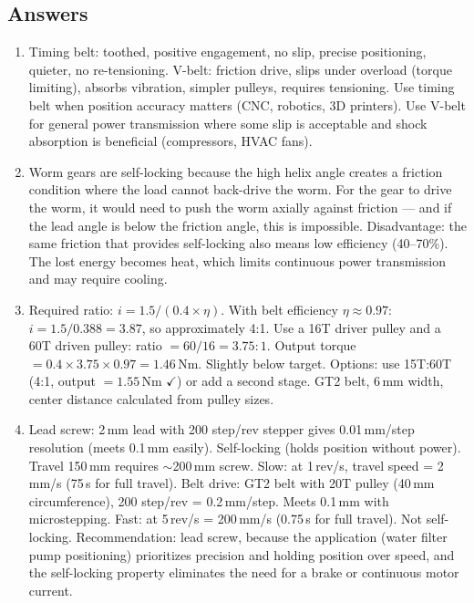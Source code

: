 \documentclass[11pt,letterpaper,twoside,openany]{book}
\begin{document}
\subsection{Answers}
\begin{enumerate}[leftmargin=1.5em]
\item Timing belt: toothed, positive engagement, no slip, precise positioning, quieter, no re-tensioning. V-belt: friction drive, slips under overload (torque limiting), absorbs vibration, simpler pulleys, requires tensioning. Use timing belt when position accuracy matters (CNC, robotics, 3D printers). Use V-belt for general power transmission where some slip is acceptable and shock absorption is beneficial (compressors, HVAC fans).

\item Worm gears are self-locking because the high helix angle creates a friction condition where the load cannot back-drive the worm. For the gear to drive the worm, it would need to push the worm axially against friction --- and if the lead angle is below the friction angle, this is impossible. Disadvantage: the same friction that provides self-locking also means low efficiency (40--70\%). The lost energy becomes heat, which limits continuous power transmission and may require cooling.

\item Required ratio: $i = 1.5 / (0.4 \times \eta)$. With belt efficiency $\eta \approx 0.97$: $i = 1.5 / 0.388 = 3.87$, so approximately 4:1. Use a 16T driver pulley and a 60T driven pulley: ratio $= 60/16 = 3.75:1$. Output torque $= 0.4 \times 3.75 \times 0.97 = 1.46$\,Nm. Slightly below target. Options: use 15T:60T (4:1, output $= 1.55$\,Nm $\checkmark$) or add a second stage. GT2 belt, 6\,mm width, center distance calculated from pulley sizes.

\item Lead screw: 2\,mm lead with 200 step/rev stepper gives 0.01\,mm/step resolution (meets 0.1\,mm easily). Self-locking (holds position without power). Travel 150\,mm requires $\sim$200\,mm screw. Slow: at 1\,rev/s, travel speed = 2\,mm/s (75\,s for full travel). Belt drive: GT2 belt with 20T pulley (40\,mm circumference), 200 step/rev = 0.2\,mm/step. Meets 0.1\,mm with microstepping. Fast: at 5\,rev/s = 200\,mm/s (0.75\,s for full travel). Not self-locking. Recommendation: lead screw, because the application (water filter pump positioning) prioritizes precision and holding position over speed, and the self-locking property eliminates the need for a brake or continuous motor current.


\end{enumerate}
\end{document}
